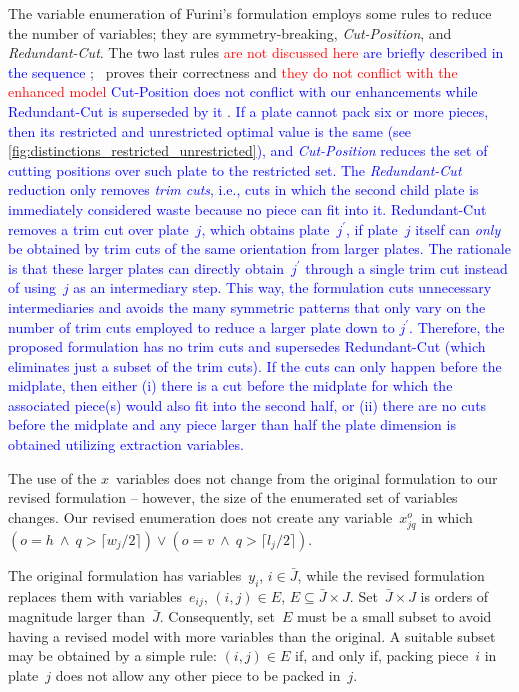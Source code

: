 \documentclass[ppgc,tese,english,formais,babel]{iiufrgs}
\newif\iffinalversion
\newcommand{\newtext}[1]{\iffinalversion%
#1%
\else%
\textcolor{blue}{#1}%
\fi%
}
\newcommand{\oldtext}[1]{\iffinalversion%
\else%
\textcolor{red}{#1}%
\fi%
}
\begin{document}
The variable enumeration of Furini's formulation employs some rules to reduce the number of variables; they are symmetry-breaking, \emph{Cut-Position}, and \emph{Redundant-Cut}.
The two last rules \oldtext{are not discussed here}\newtext{are briefly described in the sequence}; \citet{furini:2016}~proves their correctness and \oldtext{they do not conflict with the enhanced model}\newtext{Cut-Position does not conflict with our enhancements while Redundant-Cut is superseded by it}.
\newtext{
If a plate cannot pack six or more pieces, then its restricted and unrestricted optimal value is the same (see \cref{fig:distinctions_restricted_unrestricted}), and \emph{Cut-Position} reduces the set of cutting positions over such plate to the restricted set.
The \emph{Redundant-Cut} reduction only removes \emph{trim cuts}, i.e., cuts in which the second child plate is immediately considered waste because no piece can fit into it.
Redundant-Cut removes a trim cut over plate~\(j\), which obtains plate~\(j^\prime\), if plate~\(j\) itself can \emph{only} be obtained by trim cuts of the same orientation from larger plates.
The rationale is that these larger plates can directly obtain~\(j^\prime\) through a single trim cut instead of using~\(j\) as an intermediary step.
This way, the formulation cuts unnecessary intermediaries and avoids the many symmetric patterns that only vary on the number of trim cuts employed to reduce a larger plate down to \(j^\prime\).
Therefore, the proposed formulation has no trim cuts and supersedes Redundant-Cut (which eliminates just a subset of the trim cuts).
If the cuts can only happen before the midplate, then either (i) there is a cut before the midplate for which the associated piece(s) would also fit into the second half, or (ii) there are no cuts before the midplate and any piece larger than half the plate dimension is obtained utilizing extraction variables.
}

The use of the \(x\)~variables does not change from the original formulation to our revised formulation -- however, the size of the enumerated set of variables changes.
Our revised enumeration does not create any variable~\(x^o_{jq}\) in which \((o = h~\land~q > \lceil w_j / 2 \rceil) \lor (o = v~\land~q > \lceil l_j / 2 \rceil)\).

The original formulation has variables~\(y_i\), \(i \in \bar{J}\), while the revised formulation replaces them with variables~\(e_{ij}\), \((i, j) \in E\), \(E \subseteq \bar{J} \times J\).
Set~\(\bar{J} \times J\) is orders of magnitude larger than~\(\bar{J}\).
Consequently, set~\(E\) must be a small subset to avoid having a revised model with more variables than the original.
A suitable subset may be obtained by a simple rule: \((i, j) \in E\) if, and only if, packing piece~\(i\) in plate~\(j\) does not allow any other piece to be packed in~\(j\).
\end{document}
